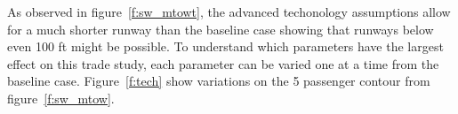 \documentclass[]{aiaa-tc}%
\begin{document}
As observed in figure~\ref{f:sw_mtowt}, the advanced techonology assumptions allow for a much shorter runway than the baseline case showing that runways below even 100 ft might be possible. 
To understand which parameters have the largest effect on this trade study, each parameter can be varied one at a time from the baseline case. 
Figure~\ref{f:tech} show variations on the 5 passenger contour from figure~\ref{f:sw_mtow}. 

\begin{figure}[h!]
 \begin{subfigmatrix}{3}%

\end{subfigmatrix}
\end{figure}
\end{document}
